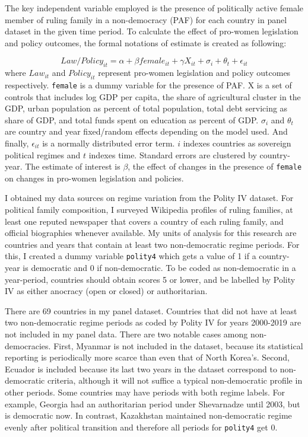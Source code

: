 \documentclass[12pt]{article}
\begin{document}
The key independent variable employed is the presence of politically active female member of ruling family in a non-democracy (PAF) for each country in panel dataset in the given time period. To calculate the effect of pro-women legislation and policy outcomes, the formal notations of estimate is created as following:

\[ Law/Policy_{it} = \alpha + \beta female_{it} + \gamma X_{it} + \sigma_{i} + \theta_{t} + \epsilon_{it} \]
where $Law_{it}$ and $Policy_{it}$ represent pro-women legislation and policy outcomes respectively. \texttt{female} is a dummy variable for the presence of PAF. X is a set of controls that includes log GDP per capita, the share of agricultural cluster in the GDP, urban population as percent of total population, total debt servicing as share of GDP, and total funds spent on education as percent of GDP. $\sigma_{i}$ and $\theta_{t}$ are country and year fixed/random effects depending on the model used. And finally, $\epsilon_{it}$ is a normally distributed error term. $i$ indexes countries as sovereign political regimes and $t$ indexes time. Standard errors are clustered by country-year. The estimate of interest is $\beta$, the effect of changes in the presence of \texttt{female} on changes in pro-women legislation and policies. 

I obtained my data sources on regime variation from the Polity IV dataset. For political family composition, I surveyed Wikipedia profiles of ruling families, at least one reputed newspaper that covers a country of each ruling family, and official biographies whenever available. My units of analysis for this research are countries and years that contain at least two non-democratic regime periods. For this, I created a dummy variable \texttt{polity4} which gets a value of 1 if a country-year is democratic and 0 if non-democratic. To be coded as non-democratic in a year-period, countries should obtain scores 5 or lower, and be labelled by Polity IV as either anocracy (open or closed) or authoritarian. 

There are 69 countries in my panel dataset. Countries that did not have at least two non-democratic regime periods as coded by Polity IV for years 2000-2019 are not included in my panel data. There are two notable cases among non-democracies. First, Myanmar is not included in the dataset, because its statistical reporting is periodically more scarce than even that of North Korea's. Second, Ecuador is included because its last two years in the dataset correspond to non-democratic criteria, although it will not suffice a typical non-democratic profile in other periods. Some countries may have  periods with both regime labels. For example, Georgia had an authoritarian period under Shevarnadze until 2003, but is democratic now. In contrast, Kazakhstan maintained non-democratic regime evenly after political transition and therefore all periods for \texttt{polity4} get 0. 
 
\end{document}
